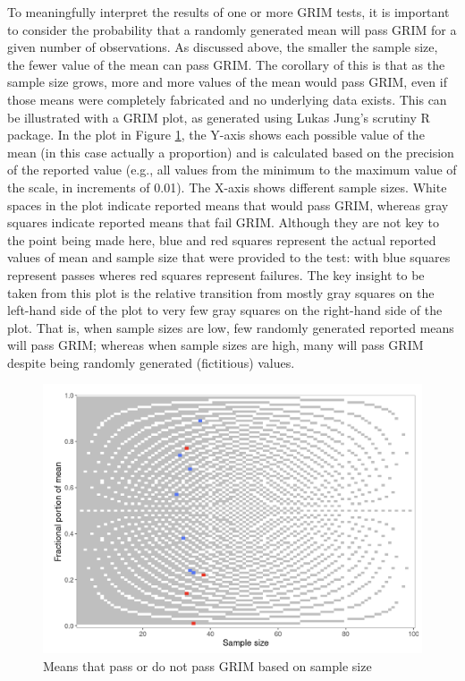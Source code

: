 \documentclass[letterpaper, 12pt]{article}
\begin{document}
{To meaningfully interpret the results of one or more GRIM tests, it is important to consider the probability that a randomly generated mean will pass GRIM for a given number of observations. As discussed above, the smaller the sample size, the fewer value of the mean can pass GRIM. The corollary of this is that as the sample size grows, more and more values of the mean would pass GRIM, even if those means were completely fabricated and no underlying data exists. This can be illustrated with a GRIM plot, as generated using Lukas Jung's {scrutiny} R package. In the plot in Figure \ref{grimfig:figure-1}, the Y-axis shows each possible value of the mean (in this case actually a proportion) and is calculated based on the precision of the reported value (e.g., all values from the minimum to the maximum value of the scale, in increments of 0.01). The X-axis shows different sample sizes. White spaces in the plot indicate reported means that would pass GRIM, whereas gray squares indicate reported means that fail GRIM. Although they are not key to the point being made here, blue and red squares represent the actual reported values of mean and sample size that were provided to the test: with blue squares represent passes wheres red squares represent failures. The key insight to be taken from this plot is the relative transition from mostly gray squares on the left-hand side of the plot to very few gray squares on the right-hand side of the plot. That is, when sample sizes are low, few randomly generated reported means will pass GRIM; whereas when sample sizes are high, many will pass GRIM despite being randomly generated (fictitious) values. 
\begin{figure}[h!]
    \centering
    \includegraphics[width=0.5\linewidth]{img//granularity_testing_grim_grimmer/grim plot.png}
    \caption{Means that pass or do not pass GRIM based on sample size}
    \label{grimfig:figure-1}
\end{figure}
}
\end{document}
